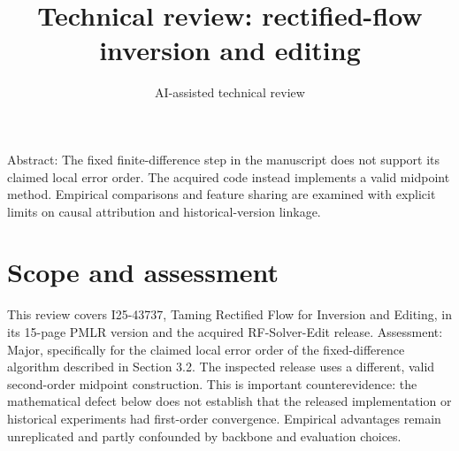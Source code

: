 \documentclass[10pt]{article}
\title{Technical review: rectified-flow inversion and editing}
\author{AI-assisted technical review}
\date{}
\begin{document}
\maketitle
Abstract: The fixed finite-difference step in the manuscript does not support its claimed local error order. The acquired code instead implements a valid midpoint method. Empirical comparisons and feature sharing are examined with explicit limits on causal attribution and historical-version linkage.\par
\section*{Scope and assessment}
This review covers I25-43737, Taming Rectified Flow for Inversion and Editing, in its 15-page PMLR version and the acquired RF-Solver-Edit release. Assessment: Major, specifically for the claimed local error order of the fixed-difference algorithm described in Section 3.2. The inspected release uses a different, valid second-order midpoint construction. This is important counterevidence: the mathematical defect below does not establish that the released implementation or historical experiments had first-order convergence. Empirical advantages remain unreplicated and partly confounded by backbone and evaluation choices.\par
\end{document}
